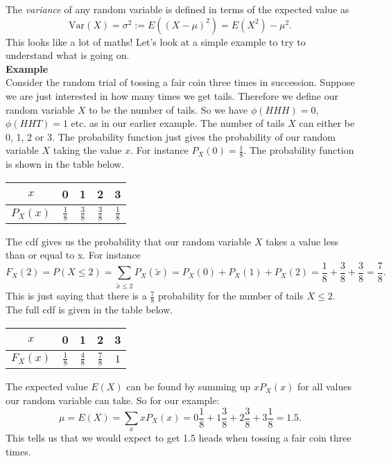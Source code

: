 The {\em variance} of any random variable is defined in terms of the expected value as
\begin{equation*}
\text{Var}(X)=\sigma^{2}:=E((X-\mu)^{2})=E(X^{2})-\mu^{2}.
\end{equation*}
This looks like a lot of maths! Let's look at a simple example to try to understand what is going on.\\
\newline
{\bf Example}\\
Consider the random trial of tossing a fair coin three times in succession. Suppose we are just interested in how many times we get tails. Therefore we define our random variable $X$ to be the number of tails. So we have $\phi(HHH)=0$, $\phi(HHT)=1$ etc. as in our earlier example. The number of tails $X$ can either be 0, 1, 2 or 3. The probability function just gives the probability of our random variable $X$ taking the value $x$. For instance $P_{X}(0)=\frac{1}{8}$. The probability function is shown in the table below. 

\begin{center}
\begin{tabular}{ |c|c|c|c|c| } 
 \hline
 $x$ & 0 & 1 & 2 & 3 \\ 
\hline $P_{X} (x)$& $\frac{1}{8}$ & $\frac{3}{8}$ & $\frac{3}{8}$ & $\frac{1}{8}$ \\
 \hline
\end{tabular}
\end{center}

The cdf gives us the probability that our random variable $X$ takes a value less than or equal to x. For instance
\begin{equation*}
F_{X}(2)=P(X\leq 2)=\sum_{\tilde{x} \leq 2} P_{X}(\tilde{x})=P_{X}(0)+P_{X}(1)+P_X(2)=\frac{1}{8}+\frac{3}{8}+\frac{3}{8}=\frac{7}{8}.
\end{equation*}
This is just saying that there is a $\frac{7}{8}$ probability for the number of tails $X\leq 2$. The full cdf is given in the table below.

\begin{center}
\begin{tabular}{ |c|c|c|c|c| } 
 \hline
 $x$ & 0 & 1 & 2 & 3 \\ 
\hline $F_{X} ( x)$& $\frac{1}{8}$ & $\frac{4}{8}$ & $\frac{7}{8}$ & $1$ \\
 \hline
\end{tabular}
\end{center}

The expected value $E(X)$ can be found by summing up $x P_{X}(x)$ for all values our random variable can take. So for our example:
\begin{equation*}
 \mu=E(X)=\sum_{x} x P_{X}(x)=0 \frac{1}{8}+1 \frac{3}{8} + 2 \frac{3}{8} + 3\frac{1}{8}=1.5.
\end{equation*}
This tells us that we would expect to get 1.5 heads when tossing a fair coin three times.

